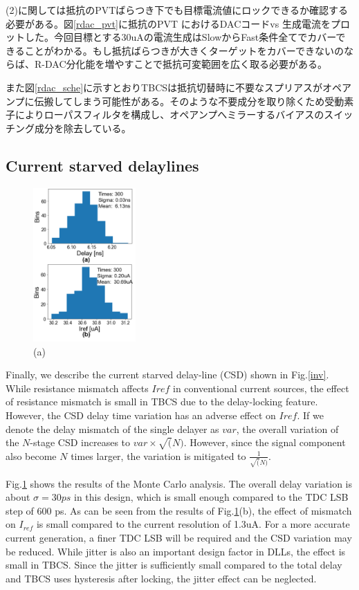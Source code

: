 \documentclass[letterpaper, 10 pt, conference]{ieeeconf}  %
\begin{document}
(2)に関しては抵抗のPVTばらつき下でも目標電流値にロックできるか確認する必要がある。図\ref{rdac_pvt}に抵抗のPVT におけるDACコードvs 生成電流をプロットした。今回目標とする30uAの電流生成はSlowからFast条件全てでカバーできることがわかる。もし抵抗ばらつきが大きくターゲットをカバーできないのならば、R-DAC分化能を増やすことで抵抗可変範囲を広く取る必要がある。

また図\ref{rdac_sche}に示すとおりTBCSは抵抗切替時に不要なスプリアスがオペアンプに伝搬してしまう可能性がある。そのような不要成分を取り除くため受動素子によりローパスフィルタを構成し、オペアンプへミラーするバイアスのスイッチング成分を除去している。

\subsection{Current starved delaylines}
\begin{figure}[!]
\centering
 \includegraphics[width=0.35\textwidth]{figs/mc.png}
  \caption{(a) 
}
\label{monte}
\end{figure}

Finally, we describe the current starved delay-line (CSD) shown in Fig.\ref{inv}. While resistance mismatch affects $I{ref}$ in conventional current sources, the effect of resistance mismatch is small in TBCS due to the delay-locking feature. However, the CSD delay time variation has an adverse effect on $I{ref}$.
If we denote the delay mismatch of the single delayer as $var$, the overall variation of the $N$-stage CSD increases to $var \times \sqrt(N)$. However, since the signal component also become  $N$ times larger, the variation is mitigated to $\frac{1}{\sqrt(N)}$.

Fig.\ref{monte} shows the results of the Monte Carlo analysis. The overall delay variation is about $\sigma= 30 ps$ in this design, which is small enough compared to the TDC LSB step of 600 ps. As can be seen from the results of Fig.\ref{monte}(b), the effect of mismatch on $I_{ref}$ is small compared to the current resolution of 1.3uA. For a more accurate current generation, a finer TDC LSB will be required and the CSD variation may be reduced.
While jitter is also an important design factor in DLLs, the effect is small in TBCS. Since the jitter is sufficiently small compared to the total delay and TBCS uses hysteresis after locking, the jitter effect can be neglected.
\end{document}
